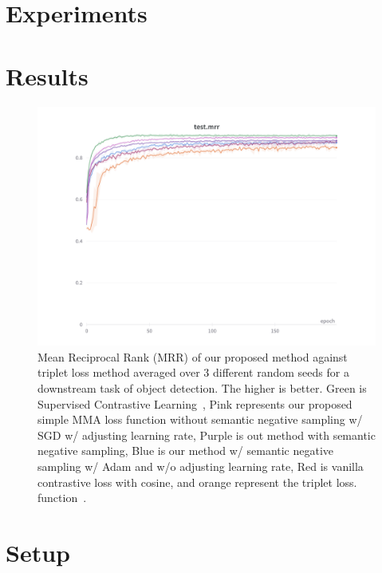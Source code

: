 \section{Experiments}

\section{Results}

\begin{figure}[tbh]
\centering
\includegraphics[width=2.1\columnwidth]{Figures/test.mrr.pdf}
\caption{Mean Reciprocal Rank (MRR) of our proposed method against triplet loss method averaged over 3 different random seeds for a downstream task of object detection. The higher is better. Green is Supervised Contrastive Learning~\cite{NEURIPS2020_supervised_contrastive}, Pink represents our proposed simple MMA loss function without semantic negative sampling w/ SGD w/ adjusting learning rate, Purple is out method with semantic negative sampling, Blue is our method w/ semantic negative sampling w/ Adam and w/o adjusting learning rate, Red is vanilla contrastive loss with cosine, and orange represent the triplet loss. function~\cite{triplet_loss_2021_CVPR}.
}

\label{fig:simple-MMA-mrr}
\end{figure}

\section{Setup}

% 

